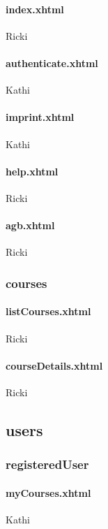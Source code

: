 				\paragraph{index.xhtml}
				Ricki
				
				\paragraph{authenticate.xhtml}
				Kathi
				
				\paragraph{imprint.xhtml}
				Kathi
				
				\paragraph{help.xhtml}
				Ricki
				
				\paragraph{agb.xhtml}
				Ricki
		
			\subsubsection{courses}
				
				\paragraph{listCourses.xhtml}
				Ricki
				
				\paragraph{courseDetails.xhtml}
				Ricki
		
		\subsection{users}
		
			\subsubsection{registeredUser}
				
				\paragraph{myCourses.xhtml}
				Kathi
				

